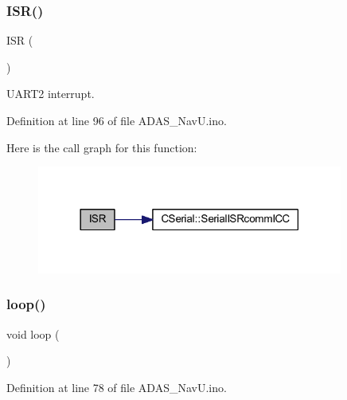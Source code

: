 \subsubsection{\texorpdfstring{ISR()}{ISR()}\hspace{0.1cm}{\footnotesize\ttfamily [2/2]}}
{\footnotesize\ttfamily I\+SR (\begin{DoxyParamCaption}\item[{U\+S\+A\+R\+T2\+\_\+\+R\+X\+\_\+vect}]{ }\end{DoxyParamCaption})}



U\+A\+R\+T2 interrupt. 



Definition at line 96 of file A\+D\+A\+S\+\_\+\+Nav\+U.\+ino.

Here is the call graph for this function\+:
\nopagebreak
\begin{figure}[H]
\begin{center}
\leavevmode
\includegraphics[width=285pt]{_a_d_a_s___nav_u_8ino_a63a86aad9ba2e355fe6380da553f554e_cgraph}
\end{center}
\end{figure}
\mbox{\label{_a_d_a_s___nav_u_8ino_afe461d27b9c48d5921c00d521181f12f}} 
\subsubsection{\texorpdfstring{loop()}{loop()}}
{\footnotesize\ttfamily void loop (\begin{DoxyParamCaption}{ }\end{DoxyParamCaption})}



Definition at line 78 of file A\+D\+A\+S\+\_\+\+Nav\+U.\+ino.

